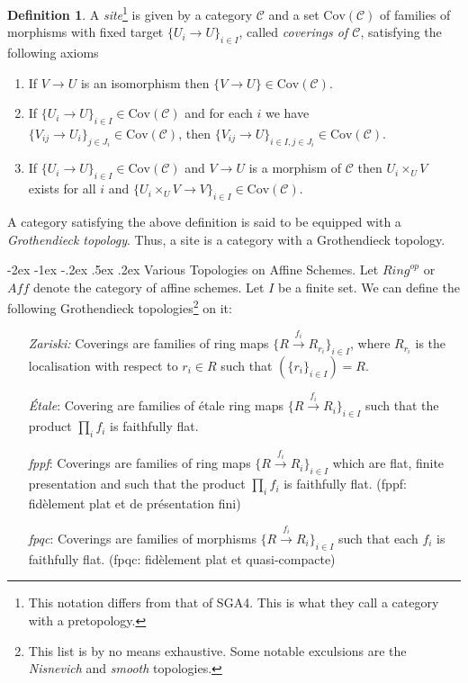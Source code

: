 \documentclass[11pt]{amsart}
\makeatletter
\renewcommand\subsection{\@startsection {subsection}{1}{\z@}%
	{-2ex \@plus -1ex \@minus -.2ex}%
	{.5ex \@plus.2ex}%
	{\normalfont\bfseries}}
\theoremstyle{definition}
\newtheorem{definition}[theorem]{Definition}
\makeatother
\begin{document}
\begin{definition}
	\label{definition-site}
	A {\it site}\footnote{This notation differs from that of SGA4. This is what they call a category with a pretopology.} is given by a category $\mathcal{C}$ and a set
	$\text{Cov}(\mathcal{C})$ of families of morphisms with fixed target
	$\{U_i \to U\}_{i \in I}$, called {\it coverings of $\mathcal{C}$},
	satisfying the following axioms
	\begin{enumerate}
		\item If $V \to U$ is an isomorphism then $\{V \to U\} \in
		\text{Cov}(\mathcal{C})$.
		\item If $\{U_i \to U\}_{i\in I} \in \text{Cov}(\mathcal{C})$ and for each
		$i$ we have $\{V_{ij} \to U_i\}_{j\in J_i} \in \text{Cov}(\mathcal{C})$, then
		$\{V_{ij} \to U\}_{i \in I, j\in J_i} \in \text{Cov}(\mathcal{C})$.
		\item If $\{U_i \to U\}_{i\in I}\in \text{Cov}(\mathcal{C})$
		and $V \to U$ is a morphism of $\mathcal{C}$ then $U_i \times_U V$
		exists for all $i$ and
		$\{U_i \times_U V \to V \}_{i\in I} \in \text{Cov}(\mathcal{C})$.
	\end{enumerate}
\end{definition}

A category  satisfying the above definition is said to be equipped with a \textit{Grothendieck topology}. Thus, a site is a category with a Grothendieck topology.

\subsection{Various Topologies on Affine Schemes.} Let $\mathit{Ring}^{op}$ or $\mathit{Aff}$ denote the category of affine schemes. Let $I$ be a finite set. We can define the following Grothendieck topologies\footnote{This list is by no means exhaustive. Some notable exculsions are the \textit{Nisnevich} and \textit{smooth} topologies.} on it:

\begin{enumerate}
	\item[\textit{Zariski:}]  Coverings are families of ring maps $\{ R \overset{f_i}{\to} R_{r_i}\}_{i \in I}$, where $R_{r_i}$ is the localisation with respect to $r_i\in R$ such that $(\{r_i\}_{i\in I})= R$.
	\item[\textit{\'{E}tale}:] Covering are families of \'{e}tale ring maps $\{ R \overset{f_i}{\to} R_i\}_{i \in I}$ such that the product $\prod_i f_i$ is faithfully flat.
	\item[\textit{fppf}:] Coverings are families of ring maps $\{ R \overset{f_i}{\to} R_i\}_{i \in I}$ which are flat, finite presentation and such that the product $\prod_i f_i$ is faithfully flat. (fppf: fid\`{e}lement plat et de pr\'{e}sentation fini)
	\item[\textit{fpqc}:] Coverings are families of morphisms $\{ R \overset{f_i}{\to} R_i\}_{i \in I}$ such that each $f_i$ is faithfully flat. (fpqc: fid\`{e}lement plat et quasi-compacte)
\end{enumerate}
\text
\end{document}
